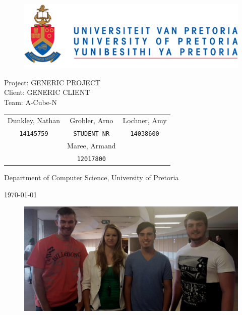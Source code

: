 \documentclass[english]{article}
\date{\today}
\begin{document}
	
	\begin{titlepage}
		\begin{figure}[!t]
			\includegraphics[width=\linewidth]{up_logo.png}
		\end{figure}
		\begin{center}
			\huge{Project: GENERIC PROJECT}\\
			\large{Client: GENERIC CLIENT}\\
			\vspace{10mm}
			\huge{Team: A-Cube-N}\\
		\end{center}
		\begin{center}
			\begin{tabular}{ c c c }
				Dunkley, Nathan & Grobler, Arno & Lochner, Amy \\
				\texttt{14145759} & \texttt{STUDENT NR} & \texttt{14038600}\\
				& Maree, Armand &\\
				& \texttt{12017800} &
			\end{tabular}
		\end{center}
		\begin{center}
			Department of Computer Science, University of Pretoria
		\end{center}
		\begin{center}
			\today
			\begin{figure}[!h]
				\includegraphics[width=\linewidth]{team.jpg}
			\end{figure}
		\end{center}
	\end{titlepage}
	\newpage
	\tableofcontents
	\newpage
\end{document}
